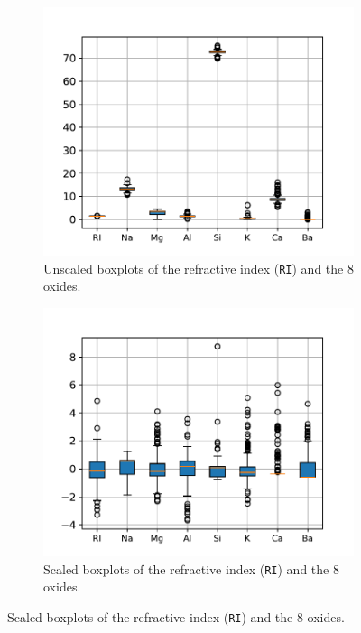 \documentclass[dtu]{dtuarticle}
\begin{document}
	\begin{figure}
		\begin{subfigure}{.49\textwidth}
			\centering
			\includegraphics[width=\textwidth]{figures/boxplot_unstandardized}
			\caption{Unscaled boxplots of the refractive index (\texttt{RI}) and the 8 oxides.}
			\label{fig:unscaled-boxplots}
		\end{subfigure}
		\hspace*{0.02\textwidth}
		\begin{subfigure}{.49\textwidth}
			\centering
			\includegraphics[width=\textwidth]{figures/boxplot_standardized}
			\caption{Scaled boxplots of the refractive index (\texttt{RI}) and the 8 oxides.}
			\label{fig:scaled-boxplots}
		\end{subfigure}
	\end{figure}
\end{document}

